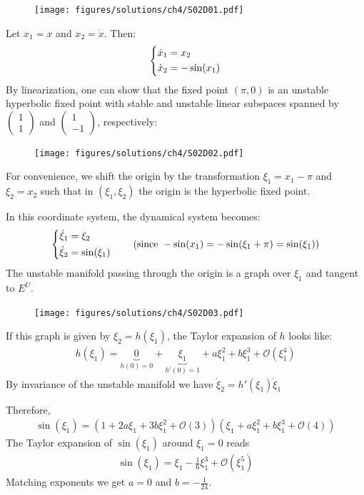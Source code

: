 \begin{solution}[4.2]
\begin{figure}[h]
	\centering
	\texttt{[image: figures/solutions/ch4/S02D01.pdf]}
\end{figure}
Let $x_1 = x$ and $x_2 = \dot{x}$. Then:
\begin{align}
	\begin{dcases}
		\dot{x}_1 = x_2 \\
		\dot{x}_2 = -\sin(x_1)
	\end{dcases}
\end{align}
By linearization, one can show that the fixed point $(\pi, 0)$ is an unstable hyperbolic fixed point with stable and unstable linear subspaces spanned by $\begin{pmatrix} 1 \\ 1 \end{pmatrix}$ and $\begin{pmatrix} 1 \\ -1 \end{pmatrix}$, respectively:
\begin{figure}[h]
	\centering
	\texttt{[image: figures/solutions/ch4/S02D02.pdf]}
\end{figure}
For convenience, we shift the origin by the transformation $\xi_1 = x_1 - \pi$ and $\xi_2 = x_2$ such that in $(\xi_1 , \xi_2)$ the origin is the hyperbolic fixed point.

In this coordinate system, the dynamical system becomes:
\begin{align}
	\begin{dcases}
		\dot{\xi}_1 = \xi_2 \\
		\dot{\xi}_2 = \sin(\xi_1)
	\end{dcases} \qquad (\text{since } -\sin(x_1) = -\sin(\xi_1 + \pi) = \sin(\xi_1))
\end{align}
The unstable manifold passing through the origin is a graph over $\xi_1$ and tangent to $E^U$.
\begin{figure}[h]
	\centering
	\texttt{[image: figures/solutions/ch4/S02D03.pdf]}
\end{figure}
If this graph is given by $\xi_2 = h(\xi_1)$, the Taylor expansion of $h$ looks like:
\begin{align}
	h(\xi_1) = \underbrace{0}_{h(0)=0} + \underbrace{\xi_1}_{h'(0)=1} + a\xi_1^2 + b\xi_1^3 + \mathcal{O}(\xi_1^4)
\end{align}
By invariance of the unstable manifold we have $\dot{\xi}_2 = h'(\xi_1) \dot{\xi}_1$

Therefore,
\begin{align}
	\sin(\xi_1) = (1 + 2a\xi_1 + 3b\xi_1^2 + \mathcal{O}(3))(\xi_1 + a\xi_1^2 + b\xi_1^3 + \mathcal{O}(4))
\end{align}
The Taylor expansion of $\sin(\xi_1)$ around $\xi_1=0$ reads
\begin{align}
	\sin(\xi_1) = \xi_1 - \frac{1}{6}\xi_1^3 + \mathcal{O}(\xi_1^5)
\end{align}
Matching exponents we get $a = 0$ and $b = -\frac{1}{24}$.


\end{solution}
